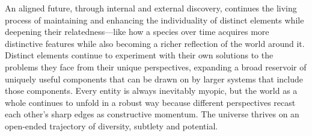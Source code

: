 \documentclass[12pt]{article}
\begin{document}
An aligned future, through internal and external discovery, continues the living process of maintaining and enhancing the individuality of distinct elements while deepening their relatedness---like how a species over time acquires more distinctive features while also becoming a richer reflection of the world around it. Distinct elements continue to experiment with their own solutions to the problems they face from their unique perspectives, expanding a broad reservoir of uniquely useful components that can be drawn on by larger systems that include those components. Every entity is always inevitably myopic, but the world as a whole continues to unfold in a robust way because different perspectives recast each other's sharp edges as constructive momentum. The universe thrives on an open-ended trajectory of diversity, subtlety and potential. 










\end{document}
